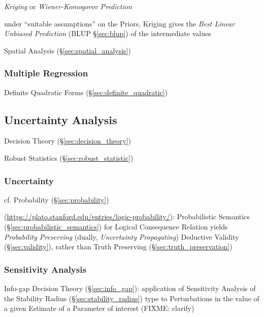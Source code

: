 \emph{Kriging} or \emph{Wiener-Komogorov Prediction}

under ``suitable assumptions'' on the Priors, Kriging gives the \emph{Best
  Linear Unbiased Prediction} (BLUP \S\ref{sec:blup}) of the intermediate values

\fist Spatial Analysis (\S\ref{sec:spatial_analysis})



\subsubsection{Multiple Regression}\label{sec:multiple_regression}

Definite Quadratic Forms (\S\ref{sec:definite_quadratic})



\subsection{Uncertainty Analysis}\label{sec:uncertainty_analysis}

\fist Decision Theory (\S\ref{sec:decision_theory})

\fist Robust Statistics (\S\ref{sec:robust_statistic})



\subsubsection{Uncertainty}\label{sec:uncertainty}

cf. Probability (\S\ref{sec:probability})

(\url{https://plato.stanford.edu/entries/logic-probability/}): Probabilistic
Semantics (\S\ref{sec:probabilistic_semantics}) for Logical Consequence Relation
yields \emph{Probability Preserving} (dually, \emph{Uncertainty Propagating})
Deductive Validity (\S\ref{sec:validity}), rather than Truth Preserving
(\S\ref{sec:truth_preservation})



\subsubsection{Sensitivity Analysis}\label{sec:sensitivity_analysis}

\fist Info-gap Decision Theory (\S\ref{sec:info_gap}): application of
Sensitivity Analysis of the Stability Radius (\S\ref{sec:stability_radius}) type
to Perturbations in the value of a given Estimate of a Parameter of interest
(FIXME: clarify)



